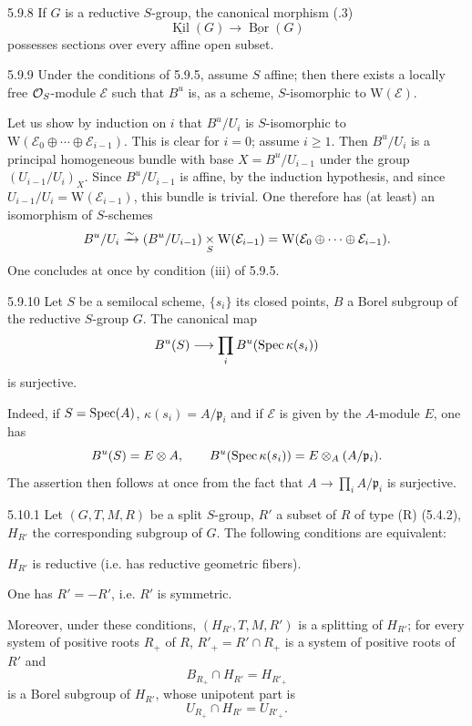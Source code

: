 \begin{corollary}{5.9.8}\label{XXII.5.9.8}
If $G$ is a reductive $S$-group, the canonical morphism (.3)
\[
\underline{\operatorname{Kil}}(G)\to\underline{\operatorname{Bor}}(G)
\]
possesses sections over every affine open subset.
\end{corollary}
\begin{corollary}{5.9.9}\label{XXII.5.9.9}
Under the conditions of 5.9.5, assume $S$ affine; then there exists a locally free $\mathcal{O}_S$-module $\mathcal E$ such that $B^u$ is, as a scheme, $S$-isomorphic to $\mathrm W(\mathcal E)$.
\end{corollary}
Let us show by induction on $i$ that $B^u/U_i$ is $S$-isomorphic to $\mathrm W(\mathcal E_0\oplus\cdots\oplus\mathcal E_{i-1})$. This is clear for $i=0$; assume $i\ge1$. Then $B^u/U_i$ is a principal homogeneous bundle with base $X=B^u/U_{i-1}$ under the group $(U_{i-1}/U_i)_X$. Since $B^u/U_{i-1}$ is affine, by the induction hypothesis, and since $U_{i-1}/U_i=\mathrm W(\mathcal E_{i-1})$, this bundle is trivial. One therefore has (at least) an isomorphism of $S$-schemes
\[
B^u/U_i\xrightarrow{\sim}(B^u/U_{i-1})\underset S\times\mathrm W(\mathcal E_{i-1})=\mathrm W(\mathcal E_0\oplus\cdots\oplus\mathcal E_{i-1}).
\]
One concludes at once by condition (iii) of 5.9.5.
\begin{corollary}{5.9.10}\label{XXII.5.9.10}
Let $S$ be a semilocal scheme, $\{s_i\}$ its closed points, $B$ a Borel subgroup of the reductive $S$-group $G$. The canonical map
\[
B^u(S)\longrightarrow\prod_i B^u(\operatorname{Spec}\kappa(s_i))
\]
is surjective.
\end{corollary}
Indeed, if $S=\operatorname{Spec}(A)$, $\kappa(s_i)=A/\mathfrak p_i$ and if $\mathcal E$ is given by the $A$-module $E$, one has
\[
B^u(S)=E\otimes A,\qquad B^u(\operatorname{Spec}\kappa(s_i))=E\otimes_A(A/\mathfrak p_i).
\]
The assertion then follows at once from the fact that $A\to\prod_i A/\mathfrak p_i$ is surjective.

\begin{proposition}{5.10.1}\label{XXII.5.10.1}
Let $(G,T,M,R)$ be a split $S$-group, $R'$ a subset of $R$ of type (R) (5.4.2), $H_{R'}$ the corresponding subgroup of $G$. The following conditions are equivalent:
\begin{enumeratei}
\item $H_{R'}$ is reductive (i.e. has reductive geometric fibers).
\item One has $R'=-R'$, i.e. $R'$ is symmetric.
\end{enumeratei}
Moreover, under these conditions, $(H_{R'},T,M,R')$ is a splitting of $H_{R'}$; for every system of positive roots $R_+$ of $R$, $R'_+=R'\cap R_+$ is a system of positive roots of $R'$ and
\[
B_{R_+}\cap H_{R'}=H_{R'_+}
\]
is a Borel subgroup of $H_{R'}$, whose unipotent part is
\[
U_{R_+}\cap H_{R'}=U_{R'_+}.
\]
\end{proposition}
